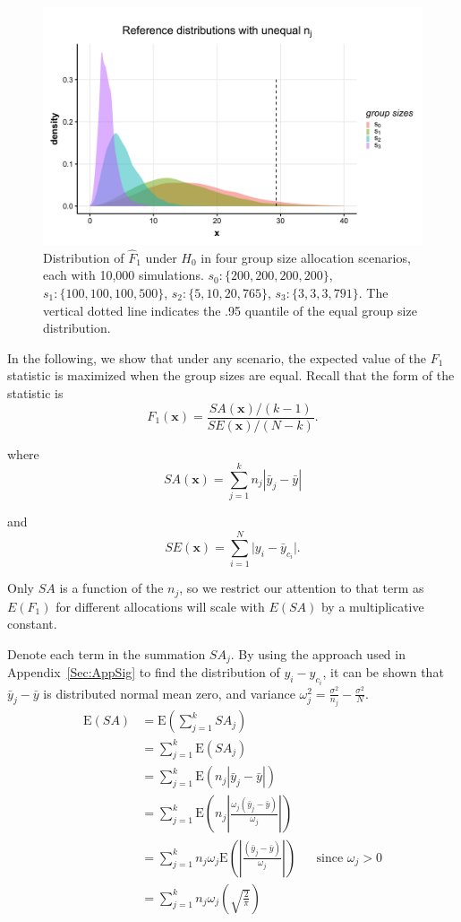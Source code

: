 \documentclass[USenglish,oneside]{article}
\newcounter{ag}
\newcounter{ab}
\newcounter{ar}
\newcounter{igh}
\newcommand{\dbsize}{\ensuremath{N}\xspace}
\newcommand{\se}{\textit{SE}\xspace}
\newcommand{\sa}{\textit{SA}\xspace}
\newcommand{\x}{\ensuremath{\mathbf{x}}\xspace}
\newcommand{\E}{\text{E}}
\newcommand{\yj}{\bar{y}_j}
\newcommand{\yb}{\bar y}
\begin{document}
\begin{figure}
\centering
\includegraphics[width=.85\linewidth]{images/unequal-group-sizes.png}
\caption{Distribution of $\hat{F}_1$ under $H_0$ in four group size allocation scenarios, each with 10,000 simulations. $s_0\colon \{200, 200, 200, 200 \}$, $s_1\colon \{100, 100, 100, 500 \}$, $s_2\colon \{5, 10, 20, 765 \}$, $s_3\colon \{3, 3, 3, 791 \}$. The vertical dotted line indicates the .95 quantile of the equal group size distribution.\label{Fig:unequal-group-sizes}}
\end{figure}

In the following, we show that under any scenario, the expected value of the $F_1$ statistic is maximized when the group sizes are equal. Recall that the form of the statistic is
$$
F_1(\x) = \frac{\sa(\x)/(k-1)}{\se(\x)/(\dbsize-k)}.
$$

where
\begin{equation*}
\sa(\x) = \sum_{j=1}^k n_j |\yj - \yb|
\end{equation*}

and
\begin{equation*}
\se(\x) = \sum_{i=1}^N \lvert y_{i} - \bar{y}_{c_i} \rvert.
\end{equation*}

Only $SA$ is a function of the $n_j$, so we restrict our attention to that term as $E(F_1)$ for different allocations will scale with $E(SA)$ by a multiplicative constant.

Denote each term in the summation $SA_j$. By using the approach used in Appendix~\ref{Sec:AppSig} to find the distribution of $y_i - y_{c_i}$, it can be shown that $\yj - \yb$ is distributed normal mean zero, and variance $\omega_j^2 = \frac{\sigma^2}{n_j} - \frac{\sigma^2}{N}$.
\begin{align*}
    \E(SA) &= \E\left(\sum_{j=1}^k SA_j\right) \\
    &= \sum_{j=1}^k \E(SA_j) \\
    &= \sum_{j=1}^k\E\left(n_j|\yj - \yb|\right) \\
    &= \sum_{j=1}^k\E\left(n_j|\frac{\omega_j(\yj - \yb)}{\omega_j}|\right) \\
    &= \sum_{j=1}^kn_j\omega_j\E\left(|\frac{(\yj - \yb)}{\omega_j}|\right) &&\text{since } \omega_j > 0 \\
    &= \sum_{j=1}^kn_j\omega_j(\sqrt{\frac{2}{\pi}})
\end{align*}
\end{document}
